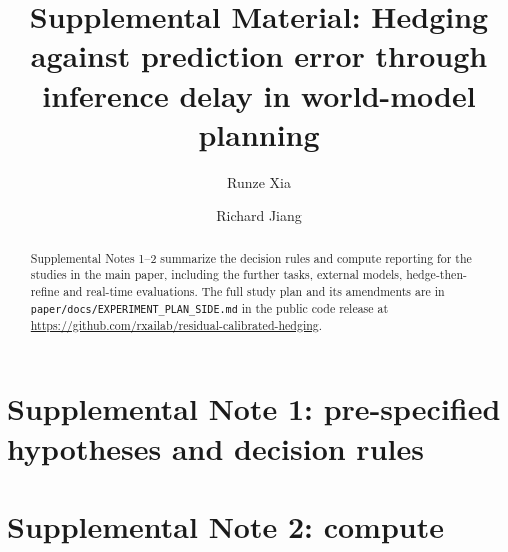 \documentclass[aps,physrev,reprint,onecolumn,notitlepage,amsmath,amssymb]{revtex4-2}
\begin{document}
\title{Supplemental Material: Hedging against prediction error through inference delay in world-model planning}
\author{Runze Xia}
\author{Richard Jiang}
\begin{abstract}
Supplemental Notes 1--2 summarize the decision rules and compute reporting for the studies in the main paper, including the further tasks, external models, hedge-then-refine and real-time evaluations. The full study plan and its amendments are in \texttt{paper/docs/EXPERIMENT\_PLAN\_SIDE.md} in the public code release at \url{https://github.com/rxailab/residual-calibrated-hedging}.
\end{abstract}
\maketitle
\section*{Supplemental Note 1: pre-specified hypotheses and decision rules}

\section*{Supplemental Note 2: compute}

\end{document}
